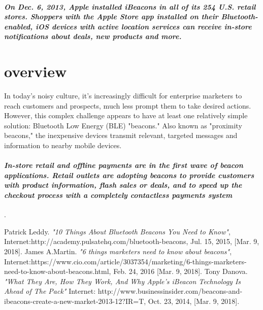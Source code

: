 \documentclass[a4paper,12pt]{article}
\begin{document}
\paragraph{\sl On Dec. 6, 2013, Apple installed iBeacons in all of its 254 U.S. retail stores. Shoppers with the Apple Store app installed on their Bluetooth-enabled, iOS devices with active location services can receive in-store notifications about deals, new products and more.}
\section{overview}
In today's noisy culture, it's increasingly difficult for enterprise marketers to reach customers and prospects, much less prompt them to take desired actions. However, this complex challenge appears to have at least one relatively simple solution: Bluetooth Low Energy (BLE) "beacons." Also known as "proximity beacons," the inexpensive devices transmit relevant, targeted messages and information to nearby mobile devices.\cite{James} 
\paragraph{\sl In-store retail and offline payments are in the first wave of beacon applications. Retail outlets are adopting beacons to provide customers with product information, flash sales or deals, and to speed up the checkout process with a completely contactless payments system}.\cite{Tony} 
 
 \begin{thebibliography}{9}
  Patrick Leddy. \textit{"10 Things About Bluetooth Beacons You Need to Know"},
 Internet:http://academy.pulsatehq.com/bluetooth-beacons, Jul. 15, 2015, [Mar. 9, 2018].
 James A.Martin. \textit{"6 things marketers need to know about beacons"}, 
Internet:https://www.cio.com/article/3037354/marketing/6-things-marketers-need-to-know-about-beacons.html, Feb. 24, 2016 [Mar. 9, 2018].
 Tony Danova. \textit{"What They Are, How They Work, And Why Apple's iBeacon Technology Is Ahead of The Pack"} 
Internet: http://www.businessinsider.com/beacons-and-ibeacons-create-a-new-market-2013-12?IR=T, Oct. 23, 2014, [Mar. 9, 2018].

\end{thebibliography}
\end{document}
